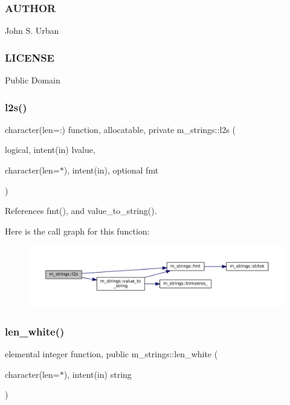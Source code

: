 \subsubsection*{A\+U\+T\+H\+OR}

John S. Urban \subsubsection*{L\+I\+C\+E\+N\+SE}

Public Domain \mbox{\label{namespacem__strings_a75aa4dfd0a231e2bcad03d26231a7c29}} 
\subsubsection{\texorpdfstring{l2s()}{l2s()}}
{\footnotesize\ttfamily character(len=\+:) function, allocatable, private m\+\_\+strings\+::l2s (\begin{DoxyParamCaption}\item[{logical, intent(in)}]{lvalue,  }\item[{character(len=$\ast$), intent(in), optional}]{fmt }\end{DoxyParamCaption})\hspace{0.3cm}{\ttfamily [private]}}



References fmt(), and value\+\_\+to\+\_\+string().

Here is the call graph for this function\+:
\nopagebreak
\begin{figure}[H]
\begin{center}
\leavevmode
\includegraphics[width=350pt]{namespacem__strings_a75aa4dfd0a231e2bcad03d26231a7c29_cgraph}
\end{center}
\end{figure}
\mbox{\label{namespacem__strings_aa1427d5dd673ff986236ba1732e693c1}} 
\subsubsection{\texorpdfstring{len\+\_\+white()}{len\_white()}}
{\footnotesize\ttfamily elemental integer function, public m\+\_\+strings\+::len\+\_\+white (\begin{DoxyParamCaption}\item[{character(len=$\ast$), intent(in)}]{string }\end{DoxyParamCaption})}



